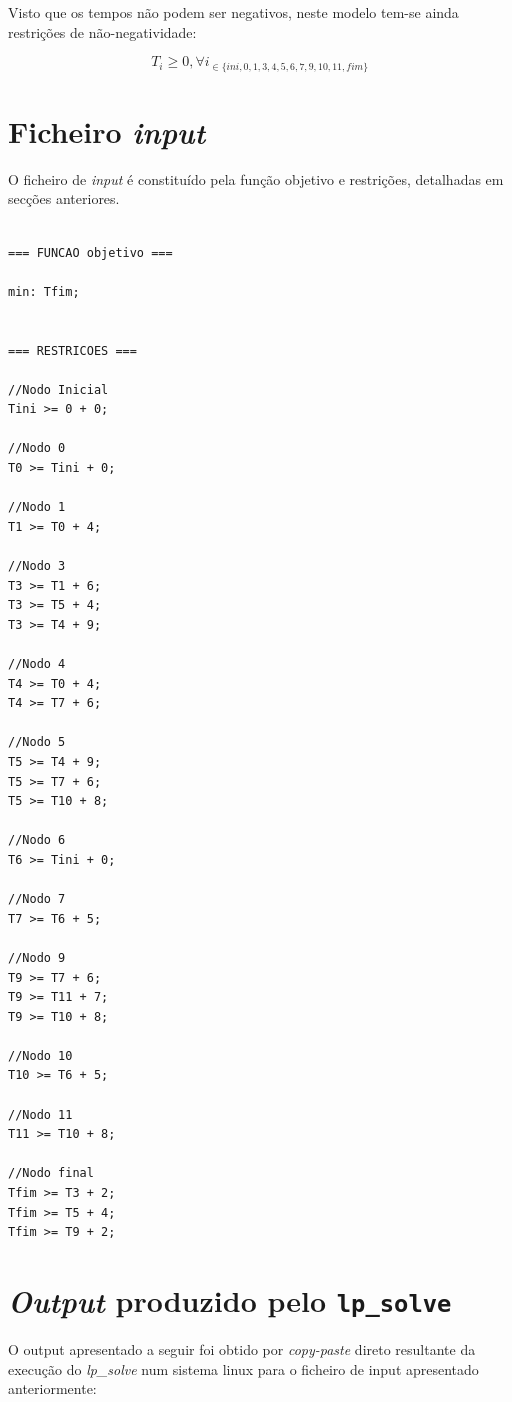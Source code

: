 Visto que os tempos não podem ser negativos, neste modelo tem-se ainda
restrições de não-negatividade:

\begin{displaymath} T_{i} \geq 0, \forall i_{\in\{ini, 0, 1, 3,
	4,5,6,7,9,10,11,fim\}} \end{displaymath}


\section{Ficheiro \emph{input}}
\label{p2:sec:ficheiro_input}
O ficheiro de \emph{input} é constituído pela função objetivo e restrições, detalhadas
em secções anteriores.

\begin{verbatim}

=== FUNCAO objetivo ===

min: Tfim;


=== RESTRICOES ===

//Nodo Inicial
Tini >= 0 + 0;

//Nodo 0
T0 >= Tini + 0;

//Nodo 1
T1 >= T0 + 4;

//Nodo 3
T3 >= T1 + 6;
T3 >= T5 + 4;
T3 >= T4 + 9;

//Nodo 4
T4 >= T0 + 4;
T4 >= T7 + 6;

//Nodo 5
T5 >= T4 + 9;
T5 >= T7 + 6;
T5 >= T10 + 8;

//Nodo 6
T6 >= Tini + 0;

//Nodo 7
T7 >= T6 + 5;

//Nodo 9
T9 >= T7 + 6;
T9 >= T11 + 7;
T9 >= T10 + 8;

//Nodo 10
T10 >= T6 + 5;

//Nodo 11
T11 >= T10 + 8;

//Nodo final
Tfim >= T3 + 2;
Tfim >= T5 + 4;
Tfim >= T9 + 2;

\end{verbatim}



\newpage
\section{\emph{Output} produzido pelo \texttt{lp\_solve}}

O output apresentado a seguir foi obtido por \emph{copy-paste} direto resultante da execução do \emph{lp\_solve} num sistema linux para o ficheiro de input apresentado anteriormente:

